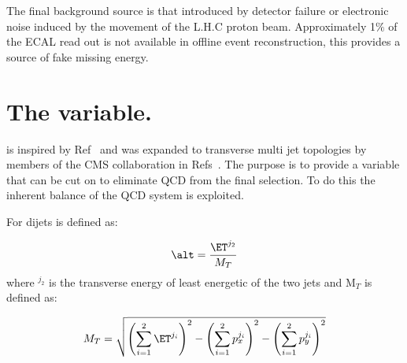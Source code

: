 The final background source is that introduced by detector failure or 
electronic noise induced by the movement of the L.H.C proton beam.
Approximately 1$\%$ of the ECAL read out is not available in offline event 
reconstruction, this provides a source of fake missing energy.

\section{The \alt variable.} %
\label{sec:the_alpha___t_variable_}
\alt is inspired by Ref~\cite{Randall:2008dk} and was expanded to transverse 
multi jet topologies by members of the CMS collaboration in 
Refs~\cite{cms-pas-sus-08005,cms-pas-sus-09001}. The purpose is to provide a 
variable that can be cut on to eliminate QCD from the final selection. To do 
this the inherent balance of the QCD system is exploited.

For dijets \alt is defined as:

\begin{equation}
  \alt = \frac{\ET^{j_{2}}}{M_{T}}
\end{equation}
where \ET$^{j_{2}}$ is the transverse energy of least energetic of the two jets 
and M$_{T}$ is defined as:

\begin{equation}
  M_{T} = \sqrt{\left(\sum^{2}_{i=1}\ET^{j_{i}}\right)^2 - \left(\sum^{2}_{i=1}p_{x}^{j_{i}}\right)^{2} - \left(\sum^{2}_{i=1}p_{y}^{j_{i}}\right)^{2}}
\end{equation}








